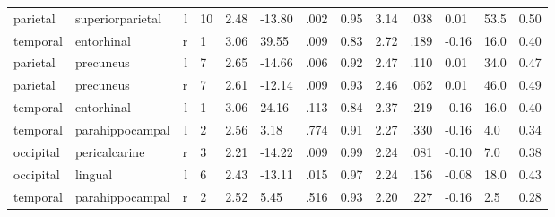 \documentclass{article}
\begin{document}
\begin{longtable}{llrR{1.5cm}R{1cm}R{1.3cm}R{1cm}R{1cm}R{1.3cm}R{1cm}R{1.8cm}R{1.3cm}R{1.8cm}}
  parietal &          superiorparietal &    l &           10 &                  2.48 &           -13.80 &               .002 &                               0.95 &                          3.14 &                            .038 &  0.01 &   53.5 &      0.50 \\
  temporal &                entorhinal &    r &            1 &                  3.06 &            39.55 &               .009 &                               0.83 &                          2.72 &                            .189 & -0.16 &   16.0 &      0.40 \\
  parietal &                 precuneus &    l &            7 &                  2.65 &           -14.66 &               .006 &                               0.92 &                          2.47 &                            .110 &  0.01 &   34.0 &      0.47 \\
  parietal &                 precuneus &    r &            7 &                  2.61 &           -12.14 &               .009 &                               0.93 &                          2.46 &                            .062 &  0.01 &   46.0 &      0.49 \\
  temporal &                entorhinal &    l &            1 &                  3.06 &            24.16 &               .113 &                               0.84 &                          2.37 &                            .219 & -0.16 &   16.0 &      0.40 \\
  temporal &           parahippocampal &    l &            2 &                  2.56 &             3.18 &               .774 &                               0.91 &                          2.27 &                            .330 & -0.16 &    4.0 &      0.34 \\
 occipital &             pericalcarine &    r &            3 &                  2.21 &           -14.22 &               .009 &                               0.99 &                          2.24 &                            .081 & -0.10 &    7.0 &      0.38 \\
 occipital &                   lingual &    l &            6 &                  2.43 &           -13.11 &               .015 &                               0.97 &                          2.24 &                            .156 & -0.08 &   18.0 &      0.43 \\
  temporal &           parahippocampal &    r &            2 &                  2.52 &             5.45 &               .516 &                               0.93 &                          2.20 &                            .227 & -0.16 &    2.5 &      0.28 \\

\end{longtable}
\end{document}

